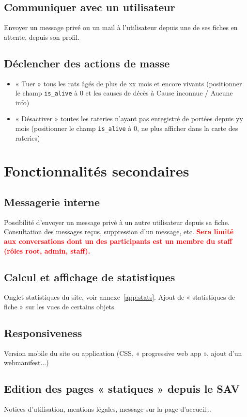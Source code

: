 ﻿\documentclass[a4paper,10pt]{article}
\newcommand\desire[1]{\noindent\textbf{\textcolor{red}{#1}}}
\begin{document}
\subsection{Communiquer avec un utilisateur}
Envoyer un message privé ou un mail à l'utilisateur depuis une de ses fiches en attente, depuis son profil.

\subsection{Déclencher des actions de masse}
\begin{itemize}
\item « Tuer » tous les rats âgés de plus de xx mois et encore vivants (positionner le champ \texttt{is\_alive} à 0 et les causes de décès à Cause inconnue / Aucune info)
\item « Désactiver » toutes les rateries n'ayant pas enregistré de portées depuis yy mois (positionner le champ \texttt{is\_alive} à 0, ne plus afficher dans la carte des rateries)
\end{itemize}


\section{Fonctionnalités secondaires}
\subsection{Messagerie interne}
Possibilité d'envoyer un message privé à un autre utilisateur depuis sa fiche. Consultation des messages reçus, suppression d'un message, etc. \desire{Sera limité aux conversations dont un des participants est un membre du staff (rôles root, admin, staff).}

\subsection{Calcul et affichage de statistiques}
Onglet statistiques du site, voir annexe~\ref{app:stats}. Ajout de « statistiques de fiche » sur les vues de certains objets.

\subsection{Responsiveness}
Version mobile du site ou application (CSS, « progressive web app », ajout d'un webmanifest...)

\subsection{Edition des pages « statiques » depuis le SAV}
Notices d'utilisation, mentions légales, message sur la page d'accueil...
\end{document}
